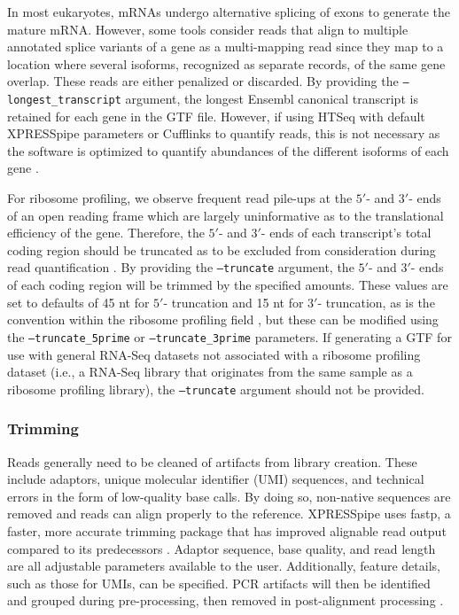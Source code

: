 \documentclass[10pt, oneside]{article}
\begin{document}
In most eukaryotes, mRNAs undergo alternative splicing of exons to generate the mature mRNA. However, some tools consider reads that align to multiple annotated splice variants of a gene as a multi-mapping read since they map to a location where several isoforms, recognized as separate records, of the same gene overlap. These reads are either penalized or discarded. By providing the \texttt{--longest\_transcript} argument, the longest Ensembl canonical transcript \cite{ensembl_canon} is retained for each gene in the GTF file. However, if using HTSeq with default XPRESSpipe parameters or Cufflinks to quantify reads, this is not necessary as the software is optimized to quantify abundances of the different isoforms of each gene \cite{cufflinks}. \par

For ribosome profiling, we observe frequent read pile-ups at the $5'$- and $3'$- ends of an open reading frame which are largely uninformative as to the translational efficiency of the gene. Therefore, the $5'$- and $3'$- ends of each transcript's total coding region should be truncated as to be excluded from consideration during read quantification \cite{ingolia_meth, weinberg_reports}. By providing the \texttt{--truncate} argument, the $5'$- and $3'$- ends of each coding region will be trimmed by the specified amounts. These values are set to defaults of 45 nt for $5'$- truncation and 15 nt for $3'$- truncation, as is the convention within the ribosome profiling field \cite{ingolia_meth}, but these can be modified using the \texttt{--truncate\_5prime} or \texttt{--truncate\_3prime} parameters. If generating a GTF for use with general RNA-Seq datasets not associated with a ribosome profiling dataset (i.e., a RNA-Seq library that originates from the same sample as a ribosome profiling library), the \texttt{--truncate} argument should not be provided.

\subsubsection{Trimming}
Reads generally need to be cleaned of artifacts from library creation. These include adaptors, unique molecular identifier (UMI) sequences, and technical errors in the form of low-quality base calls. By doing so, non-native sequences are removed and reads can align properly to the reference. XPRESSpipe uses fastp, a faster, more accurate trimming package that has improved alignable read output compared to its predecessors \cite{fastp}. Adaptor sequence, base quality, and read length are all adjustable parameters available to the user. Additionally, feature details, such as those for UMIs, can be specified. PCR artifacts will then be identified and grouped during pre-processing, then removed in post-alignment processing \cite{umi, umitools}.
\end{document}
